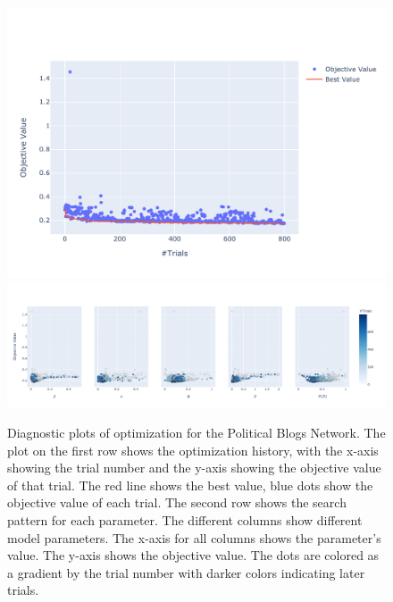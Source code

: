 \documentclass[11pt]{article}
\begin{document}
\begin{figure}[H]
    \centering
    \includegraphics[width=.7\linewidth]{../plots/overall/Optimization_History_polblogs.pdf}
    \includegraphics[width=.7\linewidth]{../plots/overall/Plot_Slice_polblogs.pdf}
  \caption{Diagnostic plots of optimization for the Political Blogs Network. The plot on the first row shows the optimization history, with the x-axis showing the trial number and the y-axis showing the objective value of that trial. The red line shows the best value, blue dots show the objective value of each trial. The second row shows the search pattern for each parameter. The different columns show different model parameters. The x-axis for all columns shows the parameter's value. The y-axis shows the objective value. The dots are colored as a gradient by the trial number with darker colors indicating later trials.}
  \label{appendix:optimization_polblogs}
\end{figure}
\end{document}
